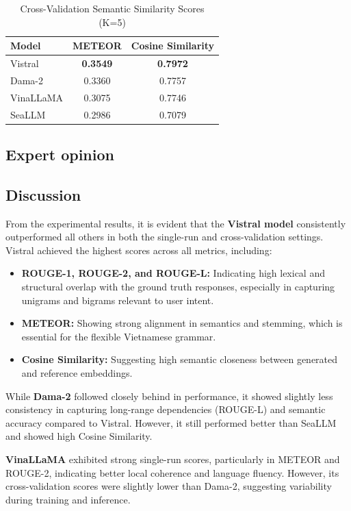 \documentclass[conference]{IEEEtran}
\begin{document}
\begin{table}[H]
\centering
\caption{Cross-Validation Semantic Similarity Scores (K=5)}
\label{tab:cv-semantic}
\begin{tabular}{|l|c|c|}
\hline
\textbf{Model} & \textbf{METEOR} & \textbf{Cosine Similarity} \\
\hline
Vistral    & \textbf{0.3549} & \textbf{0.7972} \\
Dama-2     & 0.3360 & 0.7757 \\
VinaLLaMA  & 0.3075 & 0.7746 \\
SeaLLM     & 0.2986 & 0.7079 \\
\hline
\end{tabular}
\end{table}

\subsection{Expert opinion}
\subsection{Discussion}

From the experimental results, it is evident that the \textbf{Vistral model} consistently outperformed all others in both the single-run and cross-validation settings. Vistral achieved the highest scores across all metrics, including:

\begin{itemize}
  \item \textbf{ROUGE-1, ROUGE-2, and ROUGE-L:} Indicating high lexical and structural overlap with the ground truth responses, especially in capturing unigrams and bigrams relevant to user intent.
  \item \textbf{METEOR:} Showing strong alignment in semantics and stemming, which is essential for the flexible Vietnamese grammar.
  \item \textbf{Cosine Similarity:} Suggesting high semantic closeness between generated and reference embeddings.
\end{itemize}

While \textbf{Dama-2} followed closely behind in performance, it showed slightly less consistency in capturing long-range dependencies (ROUGE-L) and semantic accuracy compared to Vistral. However, it still performed better than SeaLLM and showed high Cosine Similarity.

\textbf{VinaLLaMA} exhibited strong single-run scores, particularly in METEOR and ROUGE-2, indicating better local coherence and language fluency. However, its cross-validation scores were slightly lower than Dama-2, suggesting variability during training and inference.
\end{document}
